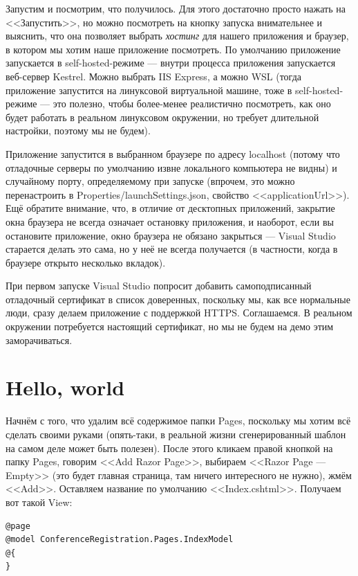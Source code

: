 \documentclass[a5paper]{article}
\begin{document}
Запустим и посмотрим, что получилось. Для этого достаточно просто нажать на <<Запустить>>, но можно посмотреть на кнопку запуска внимательнее и выяснить, что она позволяет выбрать \textit{хостинг} для нашего приложения и браузер, в котором мы хотим наше приложение посмотреть. По умолчанию приложение запускается в self-hosted-режиме --- внутри процесса приложения запускается веб-сервер Kestrel. Можно выбрать IIS Express, а можно WSL (тогда приложение запустится на линуксовой виртуальной машине, тоже в self-hosted-режиме --- это полезно, чтобы более-менее реалистично посмотреть, как оно будет работать в реальном линуксовом окружении, но требует длительной настройки, поэтому мы не будем). 

Приложение запустится в выбранном браузере по адресу localhost (потому что отладочные серверы по умолчанию извне локального компьютера не видны) и случайному порту, определяемому при запуске (впрочем, это можно перенастроить в Properties/launchSettings.json, свойство <<applicationUrl>>). Ещё обратите внимание, что, в отличие от десктопных приложений, закрытие окна браузера не всегда означает остановку приложения, и наоборот, если вы остановите приложение, окно браузера не обязано закрыться --- Visual Studio старается делать это сама, но у неё не всегда получается (в частности, когда в браузере открыто несколько вкладок).

При первом запуске Visual Studio попросит добавить самоподписанный отладочный сертификат в список доверенных, поскольку мы, как все нормальные люди, сразу делаем приложение с поддержкой HTTPS. Соглашаемся. В реальном окружении потребуется настоящий сертификат, но мы не будем на демо этим заморачиваться.

\section{Hello, world}

Начнём с того, что удалим всё содержимое папки Pages, поскольку мы хотим всё сделать своими руками (опять-таки, в реальной жизни сгенерированный шаблон на самом деле может быть полезен). После этого кликаем правой кнопкой на папку Pages, говорим <<Add Razor Page>>, выбираем <<Razor Page --- Empty>> (это будет главная страница, там ничего интересного не нужно), жмём <<Add>>. Оставляем название по умолчанию <<Index.cshtml>>. Получаем вот такой View:

\begin{verbatim}
@page
@model ConferenceRegistration.Pages.IndexModel
@{
}
\end{verbatim}
\end{document}
